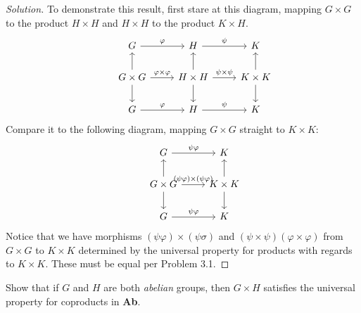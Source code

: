 \documentclass[12pt]{article}
\newenvironment{problem}[2][Problem]{\begin{trivlist}
\item[\hskip \labelsep {\bfseries #1}\hskip \labelsep {\bfseries #2.}]}{\end{trivlist}}
\newcommand{\catname}[1]{\normalfont\textbf{#1}}
\newenvironment{solution}
  {\renewcommand\qedsymbol{$\blacksquare$}\begin{proof}[Solution]}
{\end{proof}}
\begin{document}
\begin{solution}
  To demonstrate this result, first stare at this diagram, mapping 
  $G\times G$ to the product $H\times H$ and 
  $H\times H$ to the product $K\times H$.
  \[\begin{tikzcd}
    & G\ar{r}{\varphi} & H\ar{r}{\psi} & K \\
    & G\times G \ar{r}{\varphi\times\varphi}
    \ar{u}\ar{d} 
    & H\times H \ar{r}{\psi\times\psi}
    \ar{u}\ar{d} 
    & K\times K \ar{u} \ar{d} \\
    & G\ar{r}{\varphi} & H\ar{r}{\psi} & K 
\end{tikzcd}\]
Compare it to the following diagram, mapping 
$G\times G$ straight to $K\times K$:
\[\begin{tikzcd}
  & G\ar{r}{\psi\varphi} & K\\
  & G\times G \ar{r}{(\psi\varphi)\times(\psi\varphi)} 
  \ar{u} \ar{d} 
  & K\times K \ar{u} \ar{d} \\
  & G\ar{r}{\psi\varphi} & K
\end{tikzcd}\]
Notice that we have morphisms 
$(\psi\varphi) \times (\psi\sigma)$ and 
$(\psi\times\psi)(\varphi\times\varphi)$
from $G\times G$ to $K\times K$ determined by the universal property for
products with regards to $K\times K$. 
These must be equal per Problem 3.1.
\end{solution}
\begin{problem}{3.3}
  Show that if $G$ and $H$ are both \textit{abelian} groups, then
  $G\times H$ satisfies the universal property for coproducts in 
  \catname{Ab}.
\end{problem}<++>
\end{document}
